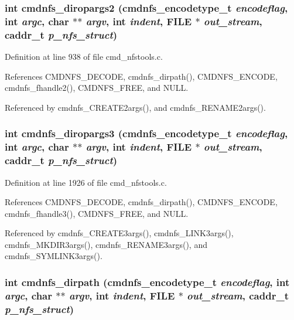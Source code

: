 \subsubsection{\setlength{\rightskip}{0pt plus 5cm}int cmdnfs\_\-diropargs2 ({\bf cmdnfs\_\-encodetype\_\-t} {\em encodeflag}, int {\em argc}, char $\ast$$\ast$ {\em argv}, int {\em indent}, FILE $\ast$ {\em out\_\-stream}, caddr\_\-t {\em p\_\-nfs\_\-struct})}\label{cmd__nfstools_8h_a26}




Definition at line 938 of file cmd\_\-nfstools.c.

References CMDNFS\_\-DECODE, cmdnfs\_\-dirpath(), CMDNFS\_\-ENCODE, cmdnfs\_\-fhandle2(), CMDNFS\_\-FREE, and NULL.

Referenced by cmdnfs\_\-CREATE2args(), and cmdnfs\_\-RENAME2args().
\subsubsection{\setlength{\rightskip}{0pt plus 5cm}int cmdnfs\_\-diropargs3 ({\bf cmdnfs\_\-encodetype\_\-t} {\em encodeflag}, int {\em argc}, char $\ast$$\ast$ {\em argv}, int {\em indent}, FILE $\ast$ {\em out\_\-stream}, caddr\_\-t {\em p\_\-nfs\_\-struct})}\label{cmd__nfstools_8h_a40}




Definition at line 1926 of file cmd\_\-nfstools.c.

References CMDNFS\_\-DECODE, cmdnfs\_\-dirpath(), CMDNFS\_\-ENCODE, cmdnfs\_\-fhandle3(), CMDNFS\_\-FREE, and NULL.

Referenced by cmdnfs\_\-CREATE3args(), cmdnfs\_\-LINK3args(), cmdnfs\_\-MKDIR3args(), cmdnfs\_\-RENAME3args(), and cmdnfs\_\-SYMLINK3args().
\subsubsection{\setlength{\rightskip}{0pt plus 5cm}int cmdnfs\_\-dirpath ({\bf cmdnfs\_\-encodetype\_\-t} {\em encodeflag}, int {\em argc}, char $\ast$$\ast$ {\em argv}, int {\em indent}, FILE $\ast$ {\em out\_\-stream}, caddr\_\-t {\em p\_\-nfs\_\-struct})}\label{cmd__nfstools_8h_a16}




